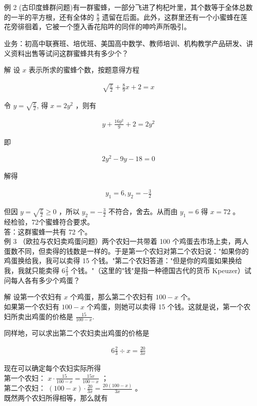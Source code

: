 \documentclass[10pt]{article}
\begin{document}
例 2 (古印度蜂群问题)有一群蜜蜂，一部分飞进了枸杞叶里，其个数等于全体总数的一半的平方根，还有全体的 $\frac{8}{9}$ 遗留在后面。此外，这群里还有一个小蜜蜂在莲花旁徘徊着，它被一个堕入香花陷吽的同伴的呻吟声所吸引。

业务：初高中联赛班、培优班、美国高中数学、教师培训、机构教学产品研发、讲义资料出售等试问这群蜜蜂共有多少个？

解 设 $x$ 表示所求的蜜蜂个数，按题意得方程

\begin{align*}
\sqrt{\frac{x}{2}}+\frac{8}{9} x+2=x
\end{align*}

令 $y=\sqrt{\frac{x}{2}}$, 得 $x=2 y^{2}$ ，则有

\begin{align*}
y+\frac{16 y^{2}}{9}+2=2 y^{2}
\end{align*}

即

\begin{align*}
2 y^{2}-9 y-18=0
\end{align*}

解得

\begin{align*}
y_{1}=6, y_{2}=-\frac{3}{2}
\end{align*}

但因 $y=\sqrt{\frac{x}{2}} \geqslant 0$ ，所以 $y_{2}=-\frac{3}{2}$ 不符合，舍去。从而由 $y_{1}=6$ 得 $x=72$ 。\\
经检验，72个蜜蜂符合要求。\\
答：这群蜜蜂一共有 72 个。\\
例 3 （欧拉与农妇卖鸡蛋问题）两个农妇一共带着 100 个鸡蛋去市场上卖，两人蛋数不同，但卖得的钱数是一样的。于是第一个农妇对第二个农妇说："如果你的鸡蛋换给我，我可以卖得 15 个钱。"第二个农妇答道："但是你的鸡蛋如果换给我，我就只能卖得 $6 \frac{2}{3}$ 个钱。"（这里的"钱"是指一种德国古代的货币 Kpeuzer）试问每人各有多少个鸡蛋？

解 设第一个农妇有 $x$ 个鸡蛋，那么第二个农妇有 $100-x$ 个。\\
如果第一个农妇有 $100-x$ 个鸡蛋，则她可以卖得 15 个钱。这就是说，第一个农妇所卖出鸡蛋的价格是 $\frac{15}{100-x}$.

同样地，可以求出第二个农妇卖出鸡蛋的价格是

\begin{align*}
6 \frac{2}{3} \div x=\frac{20}{3 x}
\end{align*}

现在可以确定每个农妇实际所得\\
第一个农妇： $x \cdot \frac{15}{100-x}=\frac{15 x}{100-x}$ ；\\
第二个农妇： $(100-x) \cdot \frac{20}{3 x}=\frac{20(100-x)}{3 x}$ 。\\
既然两个农妇所得相等，那么就有
\end{document}
